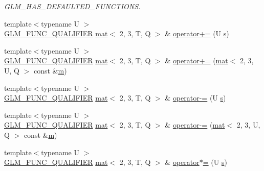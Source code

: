 \begin{DoxyCompactItemize}
\begin{DoxyCompactList}\small\item\em G\+L\+M\+\_\+\+H\+A\+S\+\_\+\+D\+E\+F\+A\+U\+L\+T\+E\+D\+\_\+\+F\+U\+N\+C\+T\+I\+O\+NS. \end{DoxyCompactList}\item 
{\footnotesize template$<$typename U $>$ }\\\mbox{\hyperlink{setup_8hpp_a33fdea6f91c5f834105f7415e2a64407}{G\+L\+M\+\_\+\+F\+U\+N\+C\+\_\+\+Q\+U\+A\+L\+I\+F\+I\+ER}} \mbox{\hyperlink{structglm_1_1mat}{mat}}$<$ 2, 3, T, Q $>$ \& \mbox{\hyperlink{structglm_1_1mat_3_012_00_013_00_01_t_00_01_q_01_4_aef7d2e0667c80238e0a1a0144a6d822f}{operator+=}} (U \mbox{\hyperlink{_s_d_l__opengl_8h_a4af680a6c683f88ed67b76f207f2e6e4}{s}})
\item 
{\footnotesize template$<$typename U $>$ }\\\mbox{\hyperlink{setup_8hpp_a33fdea6f91c5f834105f7415e2a64407}{G\+L\+M\+\_\+\+F\+U\+N\+C\+\_\+\+Q\+U\+A\+L\+I\+F\+I\+ER}} \mbox{\hyperlink{structglm_1_1mat}{mat}}$<$ 2, 3, T, Q $>$ \& \mbox{\hyperlink{structglm_1_1mat_3_012_00_013_00_01_t_00_01_q_01_4_a1ff8573bb278d2bc14b3360a652de986}{operator+=}} (\mbox{\hyperlink{structglm_1_1mat}{mat}}$<$ 2, 3, U, Q $>$ const \&\mbox{\hyperlink{_s_d_l__opengl__glext_8h_af593500c283bf1a787a6f947f503a5c2}{m}})
\item 
{\footnotesize template$<$typename U $>$ }\\\mbox{\hyperlink{setup_8hpp_a33fdea6f91c5f834105f7415e2a64407}{G\+L\+M\+\_\+\+F\+U\+N\+C\+\_\+\+Q\+U\+A\+L\+I\+F\+I\+ER}} \mbox{\hyperlink{structglm_1_1mat}{mat}}$<$ 2, 3, T, Q $>$ \& \mbox{\hyperlink{structglm_1_1mat_3_012_00_013_00_01_t_00_01_q_01_4_ad5e38086f1227daddc1ab3747efb750b}{operator-\/=}} (U \mbox{\hyperlink{_s_d_l__opengl_8h_a4af680a6c683f88ed67b76f207f2e6e4}{s}})
\item 
{\footnotesize template$<$typename U $>$ }\\\mbox{\hyperlink{setup_8hpp_a33fdea6f91c5f834105f7415e2a64407}{G\+L\+M\+\_\+\+F\+U\+N\+C\+\_\+\+Q\+U\+A\+L\+I\+F\+I\+ER}} \mbox{\hyperlink{structglm_1_1mat}{mat}}$<$ 2, 3, T, Q $>$ \& \mbox{\hyperlink{structglm_1_1mat_3_012_00_013_00_01_t_00_01_q_01_4_a3392fc843cab0b2ff28582955a12af76}{operator-\/=}} (\mbox{\hyperlink{structglm_1_1mat}{mat}}$<$ 2, 3, U, Q $>$ const \&\mbox{\hyperlink{_s_d_l__opengl__glext_8h_af593500c283bf1a787a6f947f503a5c2}{m}})
\item 
{\footnotesize template$<$typename U $>$ }\\\mbox{\hyperlink{setup_8hpp_a33fdea6f91c5f834105f7415e2a64407}{G\+L\+M\+\_\+\+F\+U\+N\+C\+\_\+\+Q\+U\+A\+L\+I\+F\+I\+ER}} \mbox{\hyperlink{structglm_1_1mat}{mat}}$<$ 2, 3, T, Q $>$ \& \mbox{\hyperlink{structglm_1_1mat_3_012_00_013_00_01_t_00_01_q_01_4_ac7f40e9c90e250e74982d6c83eb07604}{operator$\ast$=}} (U \mbox{\hyperlink{_s_d_l__opengl_8h_a4af680a6c683f88ed67b76f207f2e6e4}{s}})

\end{DoxyCompactItemize}
